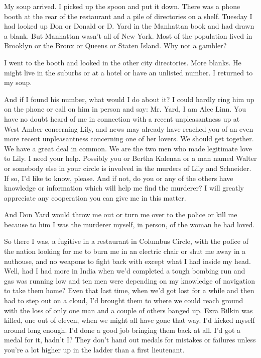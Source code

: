 \documentclass{novel}
\begin{document}
{My soup arrived. I picked up the spoon and put it down. There was a phone booth at the rear of the restaurant and a pile of directories on a shelf. Tuesday I had looked up Don or Donald or D. Yard in the Manhattan book and had drawn a blank. But Manhattan wasn’t all of New York. Most of the population lived in Brooklyn or the Bronx or Queens or Staten Island. Why not a gambler?

I went to the booth and looked in the other city directories. More blanks. He might live in the suburbs or at a hotel or have an unlisted number. I returned to my soup.

And if I found his number, what would I do about it? I could hardly ring him up on the phone or call on him in person and say: Mr. Yard, I am Alec Linn. You have no doubt heard of me in connection with a recent unpleasantness up at West Amber concerning Lily, and news may already have reached you of an even more recent unpleasantness concerning one of her lovers. We should get together. We have a great deal in common. We are the two men who made legitimate love to Lily. I need your help. Possibly you or Bertha Kalenan or a man named Walter or somebody else in your circle is involved in the murders of Lily and Schneider. If so, I’d like to know, please. And if not, do you or any of the others have knowledge or information which will help me find the murderer? I will greatly appreciate any cooperation you can give me in this matter.

And Don Yard would throw me out or turn me over to the police or kill me because to him I was the murderer myself, in person, of the woman he had loved.

So there I was, a fugitive in a restaurant in Columbus Circle, with the police of the nation looking for me to burn me in an electric chair or shut me away in a nuthouse, and no weapons to fight back with except what I had inside my head. Well, had I had more in India when we’d completed a tough bombing run and gas was running low and ten men were depending on my knowledge of navigation to take them home? Even that last time, when we’d got lost for a while and then had to step out on a cloud, I’d brought them to where we could reach ground with the loss of only one man and a couple of others banged up. Ezra Bilkin was killed, one out of eleven, when we might all have gone that way. I’d kicked myself around long enough. I’d done a good job bringing them back at all. I’d got a medal for it, hadn’t I? They don’t hand out medals for mistakes or failures unless you’re a lot higher up in the ladder than a first lieutenant.

}
\end{document}
